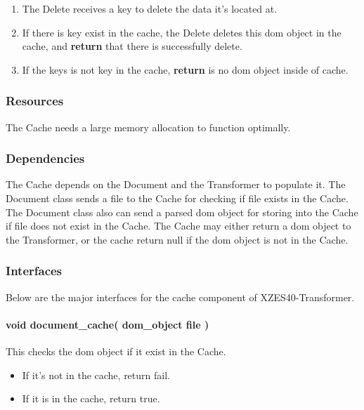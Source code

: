 \begin{enmerate}
\begin{enumerate}
    \item The Delete receives a key to delete the data it's located at.
    \item If there is key exist in the cache, the Delete deletes this \gls{dom} object in the cache, and \textbf{return} that there is successfully delete.
    \item If the keys is not key in the cache, \textbf{return} is no \gls{dom} object inside of cache.
\end{enumerate}

\subsubsection{Resources}

The Cache needs a large memory allocation to function optimally.

\subsubsection{Dependencies}

The Cache depends on the Document and the Transformer to populate it.
The Document class sends a file to the Cache for checking if file exists in the Cache.
The Document class also can send a parsed \gls{dom} object for storing into the Cache if file does not exist in the Cache.
The Cache may either return a \gls{dom} object to the Transformer, or the cache return null if the \gls{dom} object is not in the Cache.

\subsubsection{Interfaces}

Below are the major interfaces for the cache component of XZES40-Transformer.

\paragraph{void document\_cache( dom\_object file )} 
This checks the \gls{dom} object if it exist in the Cache.

\begin{itemize}
    \item If it's not in the cache, return fail. 
    \item If it is in the cache, return true.
\end{itemize}


\end{enmerate}
